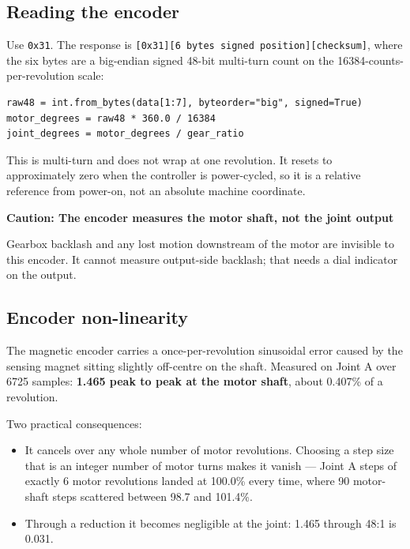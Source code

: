 \documentclass[11pt,letterpaper]{article}
\newenvironment{caution}[1]{%
    \par\addvspace{8pt}%
    \noindent{\color{cautionred}\rule{\linewidth}{0.8pt}}\par\vspace{2pt}
    \noindent\textbf{\color{cautionred}Caution: #1}\par\vspace{2pt}
}{%
    \par\vspace{2pt}\noindent{\color{cautionred}\rule{\linewidth}{0.4pt}}%
    \par\addvspace{8pt}%
}
\begin{document}
\subsection{Reading the encoder}
\label{sec:encoder}

Use \texttt{0x31}. The response is \texttt{[0x31][6 bytes signed position][checksum]},
where the six bytes are a big-endian signed 48-bit multi-turn count on the
16384-counts-per-revolution scale:

\begin{lstlisting}
raw48 = int.from_bytes(data[1:7], byteorder="big", signed=True)
motor_degrees = raw48 * 360.0 / 16384
joint_degrees = motor_degrees / gear_ratio
\end{lstlisting}

This is multi-turn and does not wrap at one revolution. It resets to approximately
zero when the controller is power-cycled, so it is a relative reference from
power-on, not an absolute machine coordinate.

\begin{caution}{The encoder measures the motor shaft, not the joint output}
Gearbox backlash and any lost motion downstream of the motor are invisible to this
encoder. It cannot measure output-side backlash; that needs a dial indicator on the
output.
\end{caution}

\subsection{Encoder non-linearity}

The magnetic encoder carries a once-per-revolution sinusoidal error caused by the
sensing magnet sitting slightly off-centre on the shaft. Measured on Joint A over
6725 samples: \textbf{1.465\textdegree{} peak to peak at the motor shaft}, about
0.407\% of a revolution.

Two practical consequences:

\begin{itemize}[leftmargin=*]
    \item It cancels over any whole number of motor revolutions. Choosing a step size
          that is an integer number of motor turns makes it vanish --- Joint A steps
          of exactly 6 motor revolutions landed at 100.0\% every time, where
          90\textdegree{} motor-shaft steps scattered between 98.7 and 101.4\%.
    \item Through a reduction it becomes negligible at the joint: 1.465\textdegree{}
          through 48:1 is 0.031\textdegree{}.
\end{itemize}
\end{document}
